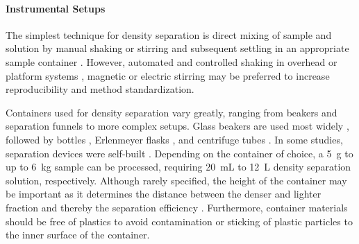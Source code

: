 \paragraph{Instrumental Setups}

The simplest technique for density separation is direct mixing of sample and solution by manual shaking or stirring and subsequent settling in an appropriate sample container \citep{MahonMicroplastics2017,DekiffOccurrence2014,ZhangSimple2018,LiuMethod2019}. However, automated and controlled shaking in overhead \citep{QuinnValidation2017} or platform systems \citep{vandenBergSewage2020}, magnetic \citep{HuangAgricultural2020} or electric stirring \citep{ImhofNovel2012} may be preferred to increase reproducibility and method standardization.

Containers used for density separation vary greatly, ranging from beakers and separation funnels to more complex setups. Glass beakers are used most widely \citep{QuinnValidation2017,KleinOccurrence2015,LiuMicroplastic2018,ZobkovEvaluation2017,HuangAgricultural2020,ZhouMicroplastics2020}, followed by bottles \citep{HurleyValidation2018},
Erlenmeyer flasks \citep{WangPoor2018}, and centrifuge tubes \citep{CorradiniEvidence2019}. In some studies, separation devices were self-built \citep{ImhofNovel2012,RennerData2019}. Depending on the container of choice, a \SI{5}{\gram}
\citep{CorradiniEvidence2019} to up to \SI{6}{\kilo\gram} \citep{ImhofNovel2012} sample can be processed, requiring \SI{20}{\milli\liter} to \SI{12}{\liter} density separation solution,
respectively. Although rarely specified, the height of the container may be important as it determines the distance between the denser and lighter fraction and thereby the separation efficiency \citep{MahatSeparation2017}. Furthermore, container materials should be free of plastics to avoid contamination or sticking of plastic particles to the inner surface of the container.

